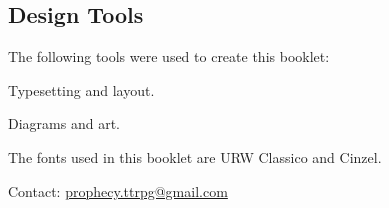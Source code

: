 \documentclass[12pt, a5paper, parskip=half-, footheight=1.4cm]{scrartcl}
\begin{document}
\subsection*{Design Tools} \label{subsection:design-tools}
The following tools were used to create this booklet:
\begin{description}[labelindent=0.25cm, leftmargin=\widthof{\hspace{0.25cm}\textbullet\space}, font=\normalfont\textbullet\space, noitemsep, topsep=-1ex]
	\item[XeLaTeX:] Typesetting and layout.
	\item[TikZ:] Diagrams and art.
\end{description}
\vspace{1ex}
The fonts used in this booklet are URW Classico and Cinzel.
\vspace{0.25\baselineskip}

\vfill

Contact: \href{mailto:prophecy.ttrpg@gmail.com}{prophecy.ttrpg@gmail.com}\\
\vspace{-2.5ex}\doclicenseText \hfill  \Huge{\doclicenseIcon}
\end{document}
